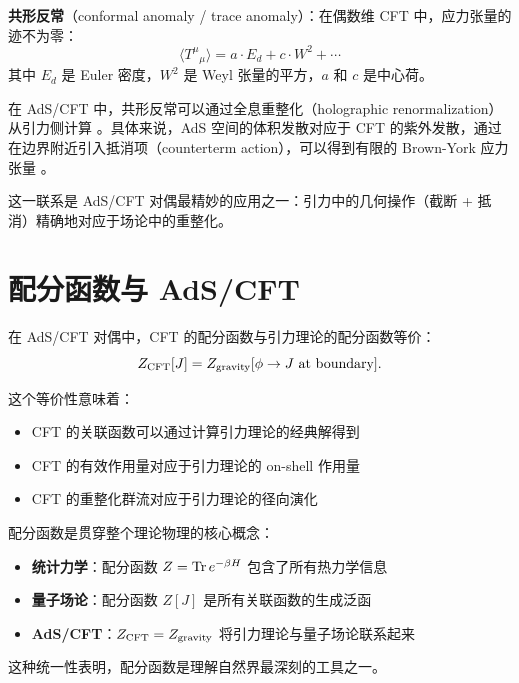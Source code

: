 \begin{remark}
\textbf{共形反常}（conformal anomaly / trace anomaly）：在偶数维 CFT 中，应力张量的迹不为零：
\begin{equation}
    \langle T^\mu{}_\mu \rangle = a \cdot E_d + c \cdot W^2 + \cdots
\end{equation}
其中 $E_d$ 是 Euler 密度，$W^2$ 是 Weyl 张量的平方，$a$ 和 $c$ 是中心荷。

在 AdS/CFT 中，共形反常可以通过全息重整化（holographic renormalization）从引力侧计算 \cite{Henningson1998}。具体来说，AdS 空间的体积发散对应于 CFT 的紫外发散，通过在边界附近引入抵消项（counterterm action），可以得到有限的 Brown-York 应力张量 \cite{Balasubramanian1999}。

这一联系是 AdS/CFT 对偶最精妙的应用之一：引力中的几何操作（截断 + 抵消）精确地对应于场论中的重整化。
\end{remark}

\section{配分函数与 AdS/CFT}

\begin{theorem}
在 AdS/CFT 对偶中，CFT 的配分函数与引力理论的配分函数等价：
\begin{equation}
    Z_{\rm CFT}[J] = Z_{\rm gravity}[\phi \to J \text{ at boundary}].
\end{equation}

这个等价性意味着：
\begin{itemize}
    \item CFT 的关联函数可以通过计算引力理论的经典解得到
    \item CFT 的有效作用量对应于引力理论的 on-shell 作用量
    \item CFT 的重整化群流对应于引力理论的径向演化
\end{itemize}
\end{theorem}

\begin{note}[配分函数的统一视角]
配分函数是贯穿整个理论物理的核心概念：
\begin{itemize}
    \item \textbf{统计力学}：配分函数 $Z = \Tr e^{-\beta H}$ 包含了所有热力学信息
    \item \textbf{量子场论}：配分函数 $Z[J]$ 是所有关联函数的生成泛函
    \item \textbf{AdS/CFT}：$Z_{\rm CFT} = Z_{\rm gravity}$ 将引力理论与量子场论联系起来
\end{itemize}
这种统一性表明，配分函数是理解自然界最深刻的工具之一。
\end{note}

